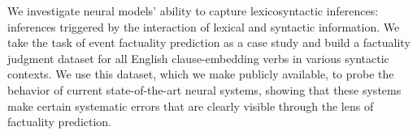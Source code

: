 We investigate neural models' ability to capture lexicosyntactic inferences: inferences triggered by the interaction of lexical and syntactic information. We take the task of event factuality prediction as a case study and build a factuality judgment dataset for all English clause-embedding verbs in various syntactic contexts. We use this dataset, which we make publicly available, to probe the behavior of current state-of-the-art neural systems, showing that these systems make certain systematic errors that are clearly visible through the lens of factuality prediction.
